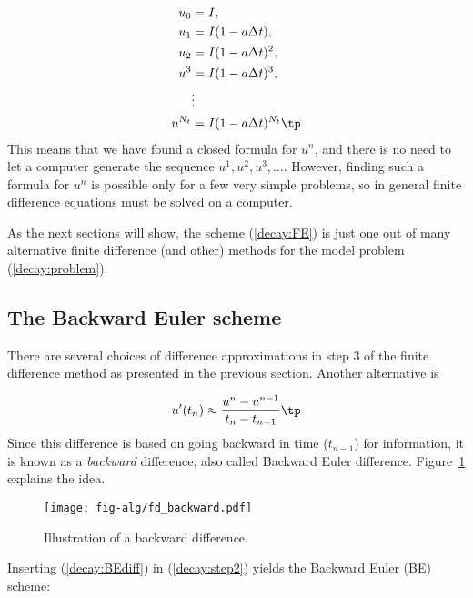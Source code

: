 \documentclass[graybox,sectrefs,envcountresetchap,open=right,final]{svmonodo}
\begin{document}
\begin{align*}
u_0 &= I,\\ 
u_1 & = I(1-a\Delta t),\\ 
u_2 & = I(1-a\Delta t)^2,\\ 
u^3 &= I(1-a\Delta t)^3,\\ 
&\vdots\\ 
u^{N_t} &= I(1-a\Delta t)^{N_t}\tp
\end{align*}
This means that we have found a closed formula for $u^n$, and there is
no need to let a computer generate the sequence $u^1, u^2, u^3, \ldots$.
However, finding such a formula for $u^n$ is possible only for a few very
simple problems, so in general finite difference equations must be
solved on a computer.

As the next sections will show, the scheme (\ref{decay:FE}) is just one
out of many alternative finite difference (and other) methods for
the model problem (\ref{decay:problem}).

\subsection{The Backward Euler scheme}
\label{decay:schemes:BE}

 

There are several choices of difference approximations in step 3 of
the finite difference method as presented in the previous section.
Another alternative is

\begin{equation}
u^{\prime}(t_n) \approx \frac{u^{n}-u^{n-1}}{t_{n}-t_{n-1}}\tp
\label{decay:BEdiff}
\end{equation}
Since this difference is based on going backward in time ($t_{n-1}$)
for information, it is known as a \emph{backward} difference, also called
Backward Euler difference.
Figure~\ref{decay:sketch:BE} explains the idea.


\begin{figure}[!ht]  %
  \centerline{\texttt{[image: fig-alg/fd\_backward.pdf]}}
  \caption{
  Illustration of a backward difference. \label{decay:sketch:BE}
  }
\end{figure}



Inserting (\ref{decay:BEdiff}) in (\ref{decay:step2}) yields
the Backward Euler (BE) scheme:
\end{document}
